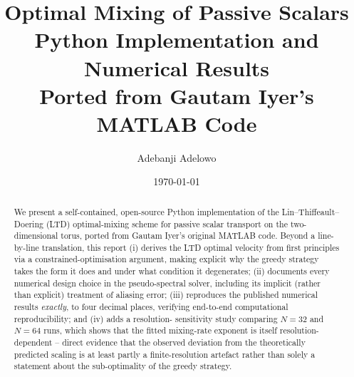 \documentclass[12pt,a4paper]{article}
\title{%
  \textbf{Optimal Mixing of Passive Scalars}\\[6pt]
  \large Python Implementation and Numerical Results\\[4pt]
  \normalsize Ported from Gautam Iyer's MATLAB Code
}
\author{Adebanji Adelowo}
\date{\today}
\theoremstyle{definition}
\theoremstyle{plain}
\begin{document}
\maketitle

\begin{center}
\end{center}
\vspace{6pt}

\begin{abstract}
\noindent
We present a self-contained, open-source Python implementation of the
Lin--Thiffeault--Doering (LTD) optimal-mixing scheme for passive scalar
transport on the two-dimensional torus, ported from Gautam Iyer's original
MATLAB code. Beyond a line-by-line translation, this report (i) derives the
LTD optimal velocity from first principles via a constrained-optimisation
argument, making explicit why the greedy strategy takes the form it does and
under what condition it degenerates; (ii) documents every numerical design
choice in the pseudo-spectral solver, including its implicit (rather than
explicit) treatment of aliasing error; (iii) reproduces the published
numerical results \emph{exactly}, to four decimal places, verifying
end-to-end computational reproducibility; and (iv) adds a resolution-
sensitivity study comparing $N=32$ and $N=64$ runs, which shows that the
fitted mixing-rate exponent is itself resolution-dependent -- direct
evidence that the observed deviation from the theoretically predicted
scaling is at least partly a finite-resolution artefact rather than solely
a statement about the sub-optimality of the greedy strategy.
\end{abstract}
\end{document}
